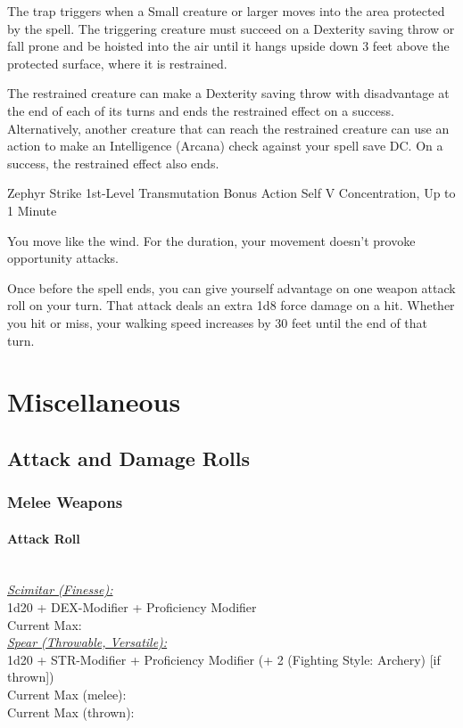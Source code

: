 \documentclass[letterpaper,openany,oneside,twocolumn]{book}
\begin{document}
The trap triggers when a Small creature or larger moves into the area protected by the spell. The triggering creature must succeed on a Dexterity saving throw or fall prone and be hoisted into the air until it hangs upside down 3 feet above the protected surface, where it is restrained.

The restrained creature can make a Dexterity saving throw with disadvantage at the end of each of its turns and ends the restrained effect on a success. Alternatively, another creature that can reach the restrained creature can use an action to make an Intelligence (Arcana) check against your spell save DC. On a success, the restrained effect also ends.

\DndSpellHeader
  {Zephyr Strike}
  {1st-Level Transmutation}
  {Bonus Action}
  {Self}
  {V}
  {Concentration, Up to 1 Minute}

You move like the wind. For the duration, your movement doesn't provoke opportunity attacks.

Once before the spell ends, you can give yourself advantage on one weapon attack roll on your turn. That attack deals an extra 1d8 force damage on a hit. Whether you hit or miss, your walking speed increases by 30 feet until the end of that turn.

\vfill\eject
\section*{Miscellaneous}
\subsection*{Attack and Damage Rolls}
\subsubsection*{Melee Weapons}
\paragraph*{Attack Roll}\hfill\\
\underline{\textit{Scimitar (Finesse):}}\\
1d20 + DEX-Modifier + Proficiency Modifier\\
\indent Current Max: 
\\
\underline{\textit{Spear (Throwable, Versatile):}}\\
1d20 + STR-Modifier + Proficiency Modifier (+ 2 (Fighting Style: Archery) [if thrown])\\
\indent Current Max (melee): \\
\indent Current Max (thrown): 
\end{document}
